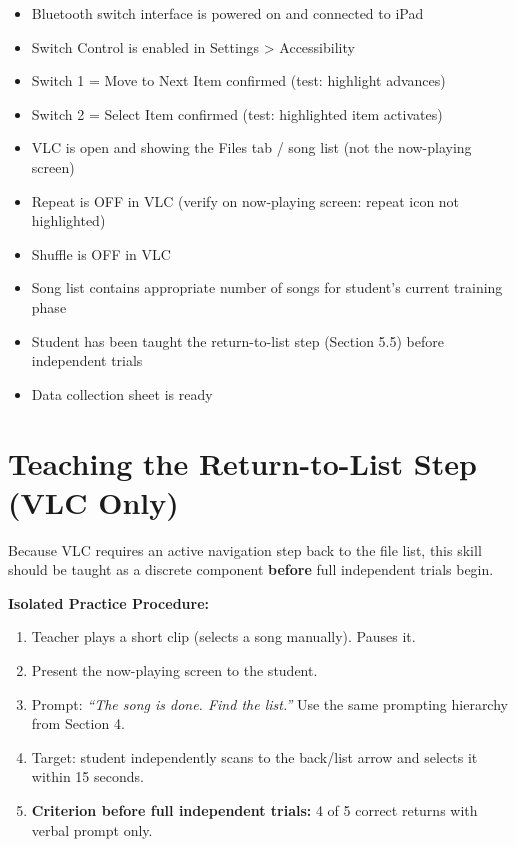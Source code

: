\documentclass[justified,openright]{tufte-book}
\DeclareRobustCommand{\checkbox}{\(\square\)}
\begin{document}
\begin{itemize}

\item[\checkbox] 
Bluetooth switch interface is powered on and connected to iPad
\item[\checkbox] 
Switch Control is enabled in Settings \textgreater{} Accessibility
\item[\checkbox] 
Switch 1 = Move to Next Item confirmed (test: highlight advances)
\item[\checkbox] 
Switch 2 = Select Item confirmed (test: highlighted item activates)
\item[\checkbox] 
VLC is open and showing the Files tab / song list (not the now-playing
  screen)
\item[\checkbox] 
Repeat is OFF in VLC (verify on now-playing screen: repeat icon not
  highlighted)
\item[\checkbox] 
Shuffle is OFF in VLC
\item[\checkbox] 
Song list contains appropriate number of songs for student's current
  training phase
\item[\checkbox] 
Student has been taught the return-to-list step (Section 5.5) before
  independent trials
\item[\checkbox] 
Data collection sheet is ready
\end{itemize}

\section{Teaching the Return-to-List Step (VLC
Only)}\label{teaching-the-return-to-list-step-vlc-only}

Because VLC requires an active navigation step back to the file list,
this skill should be taught as a discrete component \textbf{before} full
independent trials begin.

\textbf{Isolated Practice Procedure:}

\begin{enumerate}
\item
  Teacher plays a short clip (selects a song manually). Pauses it.
\item
  Present the now-playing screen to the student.
\item
  Prompt: \emph{``The song is done. Find the list.''} Use the same
  prompting hierarchy from Section 4.
\item
  Target: student independently scans to the back/list arrow and selects
  it within 15 seconds.
\item
  \textbf{Criterion before full independent trials:} 4 of 5 correct
  returns with verbal prompt only.
\end{enumerate}
\end{document}

